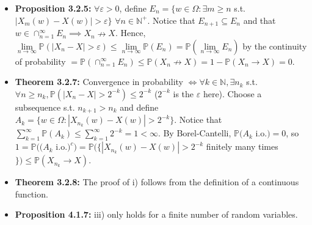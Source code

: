 \documentclass[12pt]{article}
\newcommand{\p}{\mathbb{P}}
\begin{document}
\begin{itemize}
    \item \textbf{Proposition 3.2.5:} $\forall \varepsilon > 0$, define $E_n = \{w \in \Omega: \exists m \geq n$ s.t. $|X_m(w) - X(w)| > \varepsilon\}$ $\forall n \in \mathbb{N}^+$. Notice that $E_{n+1} \subseteq E_n$ and that $w \in \cap_{n=1}^\infty E_n \implies X_n \nrightarrow X$. Hence, $\lim \limits_{n \to \infty} \p(|X_n - X| > \varepsilon) \leq \lim \limits_{n \to \infty} \p(E_n) = \p(\lim \limits_{n \to \infty} E_n)$ by the continuity of probability $= \p(\cap_{n=1}^\infty E_n) \leq \p(X_n \nrightarrow X) = 1 - \p(X_n \to X) = 0$.
    \item \textbf{Theorem 3.2.7:} Convergence in probability $\iff \forall k \in \mathbb{N}, \exists n_k$ s.t. $\forall n \geq n_k, \p(|X_n - X| > 2^{-k}) \leq 2^{-k}$ ($2^{-k}$ is the $\varepsilon$ here). Choose a subsequence s.t. $n_{k+1} > n_k$ and define $A_k = \{w \in \Omega: |X_{n_k}(w) - X(w)| > 2^{-k}\}$. Notice that $\sum_{k=1}^\infty \p(A_k) \leq \sum_{k=1}^\infty 2^{-k} = 1 < \infty$. By Borel-Cantelli, $\p(A_k$ i.o.$) = 0$, so $1 = \p((A_k$ i.o.$)^c) = \p(\{|X_{n_k}(w) - X(w)| > 2^{-k}$ finitely many times$\}) \leq \p(X_{n_k} \to X)$.
    \item \textbf{Theorem 3.2.8:} The proof of i) follows from the definition of a continuous function.
    \item \textbf{Proposition 4.1.7:} iii) only holds for a finite number of random variables.
\end{itemize}
\end{document}
